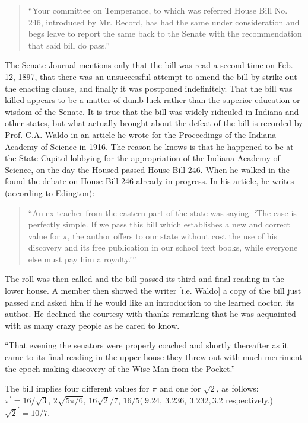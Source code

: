 \begin{quote}
``Your committee on Temperance, to which was referred House Bill No. 246,
introduced by Mr. Record, has had the same under consideration and begs leave
to report the same back to the Senate with the recommendation that said bill
do pass.''
\end{quote}

The Senate Journal mentions only that the bill was read a second time on
Feb. 12, 1897, that there was an unsuccessful attempt to amend the bill
by strike out the enacting clause, and finally it was postponed indefinitely.
That the bill was killed appears to be a matter of dumb luck rather than the
superior education or wisdom of the Senate. It is true that the bill was
widely ridiculed in Indiana and other states, but what actually brought about
the defeat of the bill is recorded by Prof. C.A. Waldo in an article he wrote
for the Proceedings of the Indiana Academy of Science in 1916. The reason
he knows is that he happened to be at the State Capitol lobbying for the
appropriation of the Indiana Academy of Science, on the day the Housed passed
House Bill 246. When he walked in the found the debate on House Bill 246
already in progress. In his article, he writes (according to Edington):

\begin{quote}
``An ex-teacher from the eastern part of the state was saying: `The case is
perfectly simple. If we pass this bill which establishes a new and correct
value for $\pi$, the author offers to our state without cost the use of his
discovery and its free publication in our school text books, while everyone
else must pay him a royalty.'{}''
\end{quote}

 The roll was then called and the bill passed its
third and final reading in the lower house. A member then showed the writer
[i.e. Waldo] a copy of the bill just passed and asked him if he would like
an introduction to the learned doctor, its author. He declined the courtesy
with thanks remarking that he was acquainted with as many crazy people as he
cared to know.

``That evening the senators were properly coached and shortly thereafter as it
came to its final reading in the upper house they threw out with much
merriment the epoch making discovery of the Wise Man from the Pocket.''


The bill implies four different values
for $\pi$ and one for $\sqrt{2}$, as follows:
$\pi^\prime = 16/\sqrt{3}$, $2\sqrt{5\pi/6}$, $16\sqrt{2}/7$, $16/5
    (~9.24     , ~3.236      , ~3.232     , 3.2$ respectively.)
$\sqrt{2}^\prime = 10/7.$

